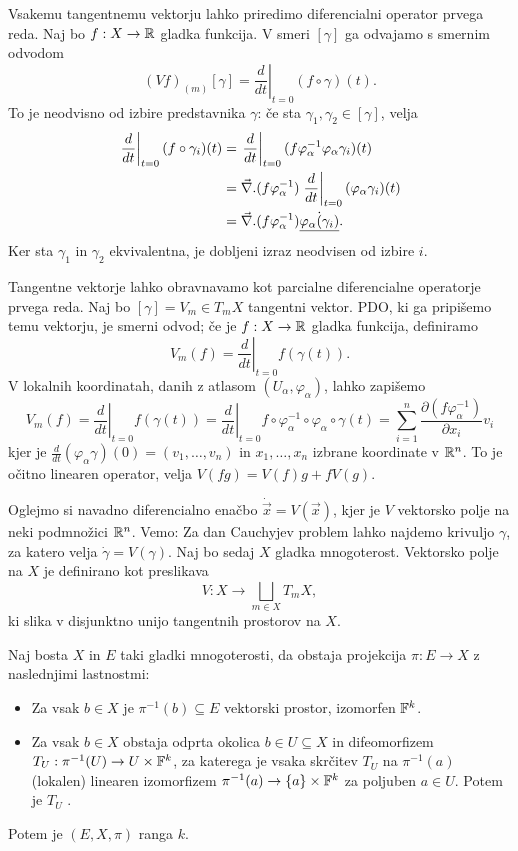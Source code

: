 Vsakemu tangentnemu vektorju lahko priredimo diferencialni operator prvega reda.
Naj bo $f: X \to \mathbb{R}$ gladka funkcija.
V smeri $[\gamma]$ ga odvajamo s smernim odvodom
\[
  (Vf)_{(m)} [\gamma] = \left. \frac{d}{dt} \right|_{t=0} (f \circ \gamma)(t).
\]
To je neodvisno od izbire predstavnika $\gamma$:
če sta $\gamma_1, \gamma_2 \in [\gamma]$, velja
\begin{align*}
  \left. \frac{d}{dt} \right|_{t=0} (f \circ \gamma_i)(t)
  &= \left. \frac{d}{dt} \right|_{t=0} (f \varphi_\alpha^{-1} \varphi_\alpha
  \gamma_i)(t) \\
  &= \vec{\nabla}{} .(f \varphi_\alpha^{-1}) \left. \frac{d}{dt} \right|_{t=0}
  (\varphi_\alpha \gamma_i)(t) \\
  &= \vec{\nabla}{} .(f \varphi_\alpha^{-1}) \dot{\underline{\varphi_\alpha(\gamma_i)}}.
\end{align*}
Ker sta $\gamma_1$ in $\gamma_2$ ekvivalentna, je dobljeni izraz neodvisen od
izbire $i$.

Tangentne vektorje lahko obravnavamo kot parcialne diferencialne operatorje
prvega reda.
Naj bo $[\gamma] = V_m \in T_m X$ tangentni vektor.
PDO, ki ga pripišemo temu vektorju, je smerni odvod; če je $f: X \to \mathbb{R}$ gladka
funkcija, definiramo
\[
  V_m(f) = \left. \frac{d}{dt} \right|_{t=0} f(\gamma(t)).
\]
V lokalnih koordinatah, danih z atlasom $(U_\alpha, \varphi_\alpha)$, lahko zapišemo
\[
  V_m(f) = \left. \frac{d}{dt} \right|_{t=0} f(\gamma(t))
  = \left. \frac{d}{dt} \right|_{t=0} f \circ \varphi_\alpha^{-1} \circ
  \varphi_\alpha \circ \gamma(t)
  = \sum_{i=1}^n \frac{\partial (f \varphi_\alpha^{-1})}{\partial x_i}
  v_i
\]
kjer je $\frac{d}{dt}(\varphi_\alpha \gamma)(0) = (v_1, \ldots, v_n)$ in $x_1,
\ldots, x_n$ izbrane koordinate v $\mathbb{R}^n$.
To je očitno linearen operator, velja $V(fg) = V(f) g + f V(g)$.


Oglejmo si navadno diferencialno enačbo $\dot{\vec{x}} = V(\vec{x})$, kjer je
$V$ vektorsko polje na neki podmnožici $\mathbb{R}^n$.
Vemo:
Za dan Cauchyjev problem lahko najdemo krivuljo $\gamma$, za katero velja
$\dot{\gamma} = V(\gamma)$.
Naj bo sedaj $X$ gladka mnogoterost.
Vektorsko polje na $X$ je definirano kot preslikava
\[
  V: X \to \bigsqcup_{m \in X} T_m X,
\]
ki slika v disjunktno unijo tangentnih prostorov na $X$.

\begin{definicija}
  Naj bosta $X$ in $E$ taki gladki mnogoterosti, da obstaja projekcija
  $\pi: E \to X$ z naslednjimi lastnostmi:
  \begin{itemize}
  \item Za vsak $b \in X$ je $\pi^{-1}(b) \subseteq E$ vektorski prostor,
	izomorfen $\mathbb{F}^k$.
  \item Za vsak $b \in X$ obstaja odprta okolica $b \in U \subseteq X$ in
	difeomorfizem $T_U: \pi^{-1}(U) \to U \times \mathbb{F}^k$, za katerega je vsaka
	skrčitev $T_U$ na $\pi^{-1}(a)$ (lokalen) linearen izomorfizem $\pi^{-1}(a)
	\to \{a\} \times \mathbb{F}^k$ za poljuben $a \in U$.
	Potem je $T_U$ .
  \end{itemize}
  Potem je $(E, X, \pi)$  ranga $k$.
\end{definicija}


